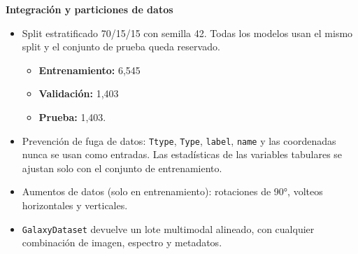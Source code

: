 \textbf{Integración y particiones de datos}

\begin{itemize}

    \item Split estratificado 70/15/15 con semilla 42. Todas los modelos usan el mismo split y el conjunto de prueba queda reservado.

        \begin{itemize}

            \item \textbf{Entrenamiento:} 6,545

            \item \textbf{Validación:} 1,403

            \item \textbf{Prueba:} 1,403.

        \end{itemize}

    \item Prevención de fuga de datos: \texttt{Ttype}, \texttt{Type}, \texttt{label}, \texttt{name} y las coordenadas nunca se usan como entradas. Las estadísticas de las variables tabulares se ajustan solo con el conjunto de entrenamiento.

    \item Aumentos de datos (solo en entrenamiento): rotaciones de 90°, volteos horizontales y verticales.

    \item \texttt{GalaxyDataset} devuelve un lote multimodal alineado, con cualquier combinación de imagen, espectro y metadatos.

\end{itemize}




